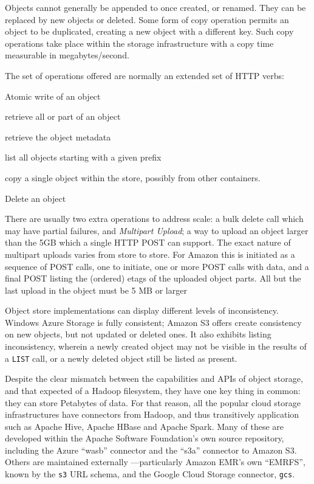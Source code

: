Objects cannot generally be appended to once created, or renamed.
They can be replaced by new objects or deleted.
Some form of copy operation permits an object to be duplicated, creating
a new object with a different key.
Such copy operations take place within the storage infrastructure with a
copy time measurable in megabytes/second.


The set of operations offered are normally an extended set of HTTP verbs:

\begin{description}[leftmargin=8em, style=nextline]
  \item[PUT] Atomic write of an object
  \item[GET] retrieve all or part of an object
  \item[HEAD] retrieve the object metadata
  \item[LIST] list all objects starting with a given prefix
  \item[COPY] copy a single object within the store, possibly from other containers.
  \item[DELETE] Delete an object
\end{description}

There are usually two extra operations to address scale:
 a bulk delete call which may have partial failures,
and \emph{Multipart Upload}; a way to upload an object larger than the
5GB which a single HTTP POST can support.
The exact nature of multipart uploads varies from store to store.
For Amazon this is initiated as a sequence of POST calls, one to initiate,
one or more POST calls with data, and a final POST listing the (ordered)
etags of the uploaded object parts.
All but the last upload in the object must be 5 MB or larger


Object store implementations can display different levels of inconsistency.
Windows Azure Storage is fully consistent;
Amazon S3 offers create consistency on new objects, but not updated or deleted ones.
It also exhibits listing inconsistency, wherein a newly created object
may not be visible in the results of a \texttt{LIST} call, or a newly deleted
object still be listed as present.


Despite the clear mismatch between the capabilities and APIs of object storage,
and that expected of a Hadoop filesystem, they have one key thing in common:
they can store Petabytes of data.
For that reason, all the popular cloud storage infrastructures have connectors
from Hadoop, and thus transitively application such as Apache Hive, Apache HBase
and Apache Spark.
Many of these are developed within the Apache Software Foundation's own
source repository, including the Azure ``wasb'' connector and the ``s3a'' connector
to Amazon S3.
Others are maintained externally ---particularly Amazon EMR's own ``EMRFS'',
known by the \texttt{s3} URL schema, and the Google Cloud Storage connector,
\texttt{gcs}.

